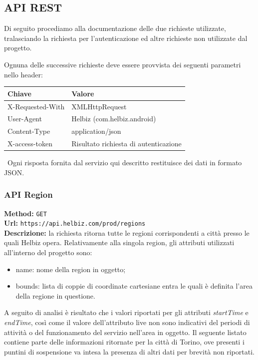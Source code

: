 \subsection{API REST}

Di seguito procediamo alla documentazione delle due richieste utilizzate,
tralasciando la richiesta per l'autenticazione ed altre richieste non
utilizzate dal progetto.

Ognuna delle successive richieste deve essere provvista dei seguenti
parametri nello header: \\

\begin{table}[h]
\centering
\begin{tabular}{|l|l|}
\hline
\rowcolor[HTML]{3166FF} 
{\color[HTML]{FFFFFF} \textbf{Chiave}} & {\color[HTML]{FFFFFF} \textbf{Valore}} \\ \hline
X-Requested-With                       & XMLHttpRequest                         \\ \hline
User-Agent                             & Helbiz (com.helbiz.android)            \\ \hline
Content-Type                           & application/json                       \\ \hline
X-access-token                         & Risultato richiesta di autenticazione  \\ \hline
\end{tabular}
\end{table}

\noindent~Ogni risposta fornita dal servizio qui descritto restituisce dei
dati in formato JSON.

\subsubsection{API Region}

\textbf{Method:} \texttt{GET} \\
\textbf{Url:} \texttt{https://api.helbiz.com/prod/regions} \\

\noindent\textbf{Descrizione:} la richiesta ritorna tutte le regioni corrispondenti
a città presso le quali Helbiz opera.
Relativamente alla singola region, gli attributi utilizzati all'interno del
progetto sono:
\begin{itemize}
\item name: nome della region in oggetto;
\item bounds: lista di coppie di coordinate cartesiane entra le quali è definita
l'area della regione in questione.
\end{itemize}
A seguito di analisi è risultato che i valori riportati per gli attributi
\emph{startTime} e \emph{endTime}, così come il valore dell'attributo live non sono
indicativi del periodi di attività o del funzionamento del servizio
nell'area in oggetto.
Il seguente listato contiene parte delle informazioni ritornate per
la città di Torino, ove presenti i puntini di sospensione va intesa
la presenza di altri dati per brevità non riportati.

